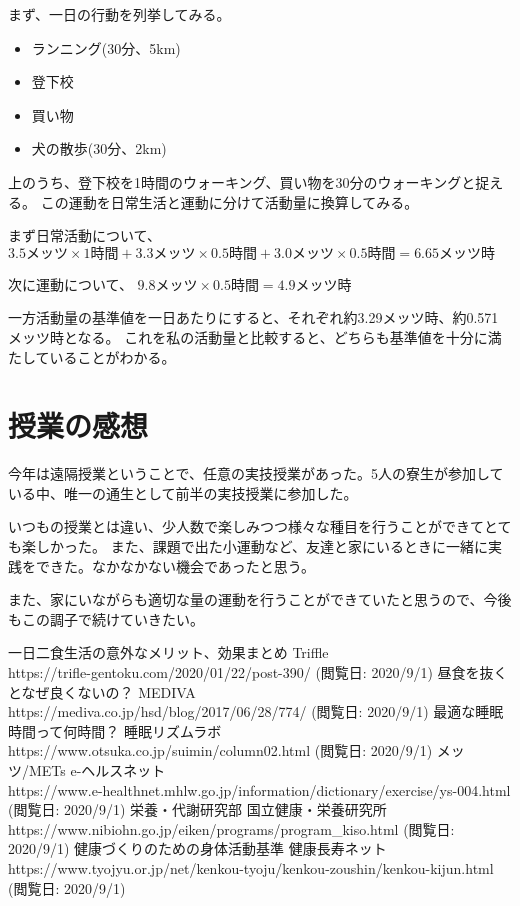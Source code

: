 \documentclass[titlepage]{jsarticle}
\begin{document}
        まず、一日の行動を列挙してみる。

        \begin{itemize}
            \item ランニング(30分、5km)
            \item 登下校
            \item 買い物
            \item 犬の散歩(30分、2km)
        \end{itemize}

        上のうち、登下校を1時間のウォーキング、買い物を30分のウォーキングと捉える。
        この運動を日常生活と運動に分けて活動量に換算してみる。

        まず日常活動について、
        $3.5 メッツ \times 1 時間 + 3.3 メッツ \times 0.5 時間 + 3.0 メッツ \times 0.5 時間 = 6.65メッツ時$

        次に運動について、
        $9.8 メッツ \times 0.5 時間 = 4.9 メッツ時$

        一方活動量の基準値を一日あたりにすると、それぞれ約3.29メッツ時、約0.571メッツ時となる。
        これを私の活動量と比較すると、どちらも基準値を十分に満たしていることがわかる。

\section{授業の感想}
    今年は遠隔授業ということで、任意の実技授業があった。5人の寮生が参加している中、唯一の通生として前半の実技授業に参加した。

    いつもの授業とは違い、少人数で楽しみつつ様々な種目を行うことができてとても楽しかった。
    また、課題で出た小運動など、友達と家にいるときに一緒に実践をできた。なかなかない機会であったと思う。

    また、家にいながらも適切な量の運動を行うことができていたと思うので、今後もこの調子で続けていきたい。

\begin{thebibliography}{99}
     一日二食生活の意外なメリット、効果まとめ Triffle \\
        https://trifle-gentoku.com/2020/01/22/post-390/
        (閲覧日: 2020/9/1)
     昼食を抜くとなぜ良くないの？ MEDIVA \\
            https://mediva.co.jp/hsd/blog/2017/06/28/774/
        (閲覧日: 2020/9/1)
     最適な睡眠時間って何時間？ 睡眠リズムラボ \\
        https://www.otsuka.co.jp/suimin/column02.html
        (閲覧日: 2020/9/1)
    \bibitem{} メッツ/METs e-ヘルスネット \\
        https://www.e-healthnet.mhlw.go.jp/information/dictionary/exercise/ys-004.html \\
        (閲覧日: 2020/9/1)
    \bibitem{} 栄養・代謝研究部 国立健康・栄養研究所 \\
        https://www.nibiohn.go.jp/eiken/programs/program\_kiso.html
        (閲覧日: 2020/9/1)
    \bibitem{} 健康づくりのための身体活動基準 健康長寿ネット \\
        https://www.tyojyu.or.jp/net/kenkou-tyoju/kenkou-zoushin/kenkou-kijun.html \\
        (閲覧日: 2020/9/1)
\end{thebibliography}
\end{document}
